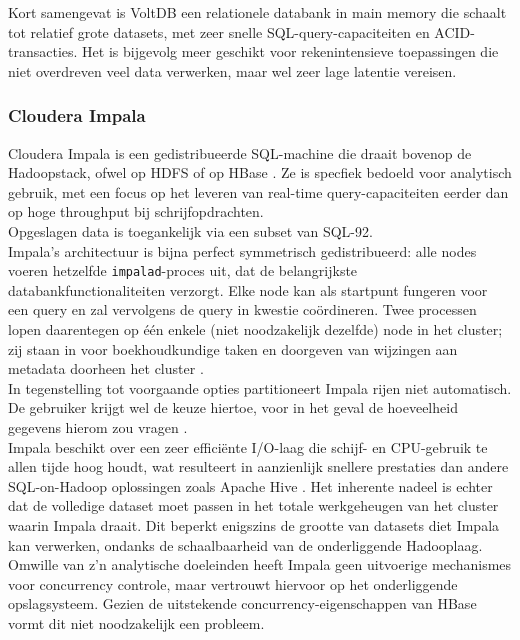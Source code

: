 Kort samengevat is VoltDB een relationele databank in main memory die schaalt tot relatief grote datasets, met zeer snelle SQL-query-capaciteiten en ACID-transacties. Het is bijgevolg meer geschikt voor rekenintensieve toepassingen die niet overdreven veel data verwerken, maar wel zeer lage latentie vereisen.

\subsubsection{Cloudera Impala}

Cloudera Impala is een gedistribueerde SQL-machine die draait bovenop de Hadoopstack, ofwel op HDFS of op HBase \cite{cloudera_impala}. Ze is specfiek bedoeld voor analytisch gebruik, met een focus op het leveren van real-time query-capaciteiten eerder dan op hoge throughput bij schrijfopdrachten.\\
Opgeslagen data is toegankelijk via een subset van SQL-92.\\
Impala's architectuur is bijna perfect symmetrisch gedistribueerd: alle nodes voeren hetzelfde \texttt{impalad}-proces uit, dat de belangrijkste databankfunctionaliteiten verzorgt. Elke node kan als startpunt fungeren voor een query en zal vervolgens de query in kwestie co\"ordineren. Twee processen lopen daarentegen op \'e\'en enkele (niet noodzakelijk dezelfde) node in het cluster; zij staan in voor boekhoudkundige taken en doorgeven van wijzingen aan metadata doorheen het cluster \cite{impala_components}.\\
In tegenstelling tot voorgaande opties partitioneert Impala rijen niet automatisch. De gebruiker krijgt wel de keuze hiertoe, voor in het geval de hoeveelheid gegevens hierom zou vragen \cite{impala_partitioning}.\\
Impala beschikt over een zeer effici\"ente I/O-laag die schijf- en CPU-gebruik te allen tijde hoog houdt, wat resulteert in aanzienlijk snellere prestaties dan andere SQL-on-Hadoop oplossingen zoals Apache Hive \cite{floratou2014sql}. Het inherente nadeel is echter dat de volledige dataset moet passen in het totale werkgeheugen van het cluster waarin Impala draait. Dit beperkt enigszins de grootte van datasets diet Impala kan verwerken, ondanks de schaalbaarheid van de onderliggende Hadooplaag.\\
Omwille van z'n analytische doeleinden heeft Impala geen uitvoerige mechanismes voor concurrency controle, maar vertrouwt hiervoor op het onderliggende opslagsysteem. Gezien de uitstekende concurrency-eigenschappen van HBase vormt dit niet noodzakelijk een probleem.

